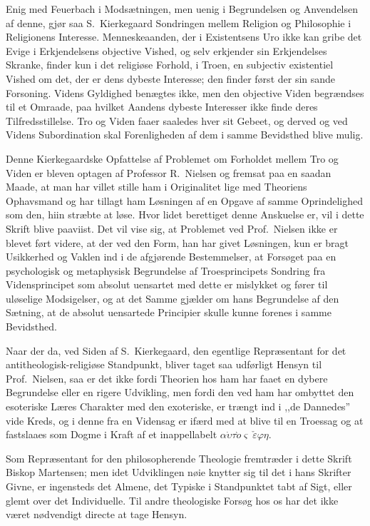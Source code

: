 \documentclass[12pt,a4paper]{article}
\begin{document}
Enig med Feuerbach i Modsætningen, men uenig i Begrundelsen og
Anvendelsen af denne, gjør saa S.\ Kierkegaard Sondringen mellem
Religion og Philosophie i Religionens Interesse. Menneskeaanden, der i
Existentsens Uro ikke kan gribe det Evige i Erkjendelsens objective
Vished, og selv erkjender sin Erkjendelses Skranke, finder kun i det
religiøse Forhold, i Troen, en subjectiv existentiel Vished om det,
der er dens dybeste Interesse; den finder først der sin sande
Forsoning. Videns Gyldighed benægtes ikke, men den objective Viden
begrændses til et Omraade, paa hvilket Aandens dybeste Interesser ikke
finde deres Tilfredsstillelse. Tro og Viden faaer saaledes hver sit
Gebeet, og derved og ved Videns Subordination skal Forenligheden af
dem i samme Bevidsthed blive mulig.

Denne Kierkegaardske Opfattelse af Problemet om Forholdet mellem Tro
og Viden er bleven optagen af Professor R.\ Nielsen og fremsat paa en
saadan Maade, at man har villet stille ham i Originalitet lige med
Theoriens Ophavsmand og har tillagt ham Løsningen af en Opgave af
samme Oprindelighed som den, hiin stræbte at løse. Hvor lidet
berettiget denne Anskuelse er, vil i dette Skrift blive paaviist. Det
vil vise sig, at Problemet ved Prof.\ Nielsen ikke er blevet ført
videre, at der ved den Form, han har givet Løsningen, kun er bragt
Usikkerhed og Vaklen ind i de afgjørende Bestemmelser, at Forsøget paa
en psychologisk og metaphysisk Begrundelse af Troesprincipets Sondring
fra Vidensprincipet som absolut uensartet med dette er mislykket og
fører til uløselige Modsigelser, og at det Samme gjælder om hans
Begrundelse af den Sætning, at de absolut uensartede Principier skulle
kunne forenes i samme Bevidsthed.

Naar der da, ved Siden af S.\ Kierkegaard, den egentlige Repræsentant
for det antitheologisk-religiøse Standpunkt, bliver taget saa udførligt
Hensyn til Prof.\ Nielsen, saa er det ikke fordi Theorien hos ham har
faaet en dybere Begrundelse eller en rigere Udvikling, men fordi den
ved ham har ombyttet den esoteriske Læres Charakter med den exoteriske,
er trængt ind i ,,de Dannedes'' vide Kreds, og i denne fra en
Vidensag er ifærd med at blive til en Troessag og at fastslaaes som
Dogme i Kraft af et inappellabelt $\alpha\dot{\upsilon}\tau\grave{o}\varsigma\ \check{\varepsilon}\varphi\eta$.

Som Repræsentant for den philosopherende Theologie fremtræder i dette
Skrift Biskop Martensen; men idet Udviklingen nøie knytter sig til det
i hans Skrifter Givne, er ingensteds det Almene, det Typiske i
Standpunktet tabt af Sigt, eller glemt over det Individuelle. Til andre
theologiske Forsøg hos os har det ikke været nødvendigt directe at
tage Hensyn.
\end{document}
